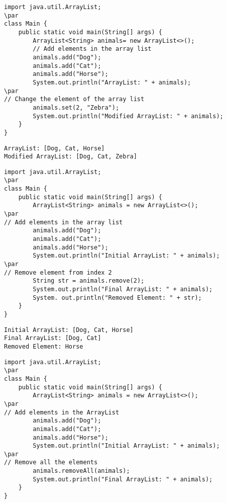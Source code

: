 \documentclass{book}
\def\lthtmlcheckvsize{\ifdim\ht\sizebox<\vsize 
  \ifdim\wd\sizebox<\hsize\expandafter\hfill\fi \expandafter\vfill
  \else\expandafter\vss\fi}%
\begin{document}
{\newpage\clearpage
{}%
\begin{lstlisting}
import java.util.ArrayList;
\par
class Main {
    public static void main(String[] args) {
        ArrayList<String> animals= new ArrayList<>();
        // Add elements in the array list
        animals.add("Dog");
        animals.add("Cat");
        animals.add("Horse");
        System.out.println("ArrayList: " + animals);
\par
// Change the element of the array list
        animals.set(2, "Zebra");
        System.out.println("Modified ArrayList: " + animals);
    }
}
\end{lstlisting}%
\lthtmlfigureZ
\lthtmlcheckvsize\clearpage}

{\newpage\clearpage
{}%
\begin{lstlisting}
ArrayList: [Dog, Cat, Horse]
Modified ArrayList: [Dog, Cat, Zebra]
\end{lstlisting}%
\lthtmlfigureZ
\lthtmlcheckvsize\clearpage}

{\newpage\clearpage
{}%
\begin{lstlisting}
import java.util.ArrayList;
\par
class Main {
    public static void main(String[] args) {
        ArrayList<String> animals = new ArrayList<>();
\par
// Add elements in the array list
        animals.add("Dog");
        animals.add("Cat");
        animals.add("Horse");
        System.out.println("Initial ArrayList: " + animals);
\par
// Remove element from index 2
        String str = animals.remove(2);
        System.out.println("Final ArrayList: " + animals);
        System. out.println("Removed Element: " + str);
    }
}
\end{lstlisting}%
\lthtmlfigureZ
\lthtmlcheckvsize\clearpage}

{\newpage\clearpage
{}%
\begin{lstlisting}
Initial ArrayList: [Dog, Cat, Horse]
Final ArrayList: [Dog, Cat]
Removed Element: Horse
\end{lstlisting}%
\lthtmlfigureZ
\lthtmlcheckvsize\clearpage}

{\newpage\clearpage
{}%
\begin{lstlisting}
import java.util.ArrayList;
\par
class Main {
    public static void main(String[] args) {
        ArrayList<String> animals = new ArrayList<>();
\par
// Add elements in the ArrayList
        animals.add("Dog");
        animals.add("Cat");
        animals.add("Horse");
        System.out.println("Initial ArrayList: " + animals);
\par
// Remove all the elements
        animals.removeAll(animals);
        System.out.println("Final ArrayList: " + animals);
    }
}
\end{lstlisting}%
\lthtmlfigureZ
\lthtmlcheckvsize\clearpage}
\end{document}
